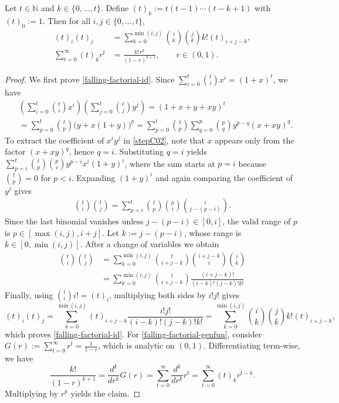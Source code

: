 \documentclass[10pt,a4paper]{amsart}
\begin{document}
\begin{lem}
Let $t\in\mathbb{N}$ and $k\in\{0,\dots,t\}$. Define $(t)_k:=t(t-1)\cdots(t-k+1)$ with $(t)_0:=1$. Then for all $i,j\in\{0,\dots,t\}$,
\begin{align}
(t)_i(t)_j &= \sum_{k=0}^{\min(i,j)} \binom{i}{k}\binom{j}{k}k!(t)_{i+j-k}, \label{falling-factorial-id} \\
\sum_{t=0}^{\infty} (t)_k r^t &= \frac{k!\,r^k}{(1-r)^{k+1}}, \qquad r\in(0,1).
\label{falling-factorial-genfun}
\end{align}
\end{lem}

\begin{proof}
We first prove \eqref{falling-factorial-id}. Since $\sum_{i=0}^t \binom{t}{i}x^i = (1+x)^t$, we have
\begin{align}
&\left(\sum_{i=0}^t \binom{t}{i}x^i \right)\left(\sum_{j=0}^t \binom{t}{j}y^j \right)
= (1+x+y+xy)^t \nonumber \\ 
&= \sum_{p=0}^t\binom{t}{p}\bigl(y + x(1+y)\bigr)^p = \sum_{p=0}^t \binom{t}{p} \sum_{q=0}^p \binom{p}{q}y^{p-q}(x+xy)^q. \label{stepC02}
\end{align}
To extract the coefficient of $x^iy^j$ in \eqref{stepC02}, note that $x$ appears only from the factor $(x+xy)^q$, hence $q=i$. Substituting $q=i$ yields $\sum_{p=i}^t \binom{t}{p} \binom{p}{i} y^{p-i} x^i(1+y)^i$, where the sum starts at $p=i$ because $\binom{t}{p}=0$ for $p<i$. Expanding $(1+y)^i$ and again comparing the coefficient of $y^j$ gives
\begin{align}
    \binom{t}{i}\binom{t}{j} =\sum_{p=i}^t \binom{t}{p} \binom{p}{i} \binom{i}{j-(p-i)}.\label{stepC03}
\end{align}
Since the last binomial vanishes unless $j-(p-i)\in[0,i]$, the valid range of $p$ is 
$p\in[\max(i,j),i+j]$. Let $k:=j-(p-i)$, whose range is $k\in[0,\min(i,j)]$. After a change of variables we obtain
\begin{align}
    \binom{t}{i}\binom{t}{j} &=\sum_{k=0}^{\min(i,j)} \binom{t}{i+j-k} \binom{i+j-k}{i} \binom{i}{k} \nonumber \\
    &= \sum_{k=0}^{\min(i,j)}  \binom{t}{i+j-k} \frac{(i+j-k)!}{(i-k)!(j-k)!k!}\label{stepC04}
\end{align}
Finally, using $\binom{t}{i}i!=(t)_i$, multiplying both sides by $i!j!$ gives 
\[
(t)_i(t)_j = \sum_{k=0}^{\min(i,j)} (t)_{i+j-k} \frac{i!j!}{(i-k)!(j-k)!k!} = \sum_{k=0}^{\min(i,j)}\binom{i}{k}\binom{j}{k}k!(t)_{i+j-k},
\]
which proves \eqref{falling-factorial-id}. For \eqref{falling-factorial-genfun}, consider $G(r):=\sum_{t=0}^\infty r^t=\frac{1}{1-r}$, which is analytic on $(0,1)$. Differentiating term-wise, we have
\[
\frac{k!}{(1-r)^{k+1}} =\frac{d^k}{d r^k}G(r) = \sum_{t=0}^{\infty} \frac{d^k}{dr^k}r^t = \sum_{t=0}^\infty (t)_k r^{t-k}. 
\]
Multiplying by $r^k$ yields the claim. 
\end{proof}
\end{document}
